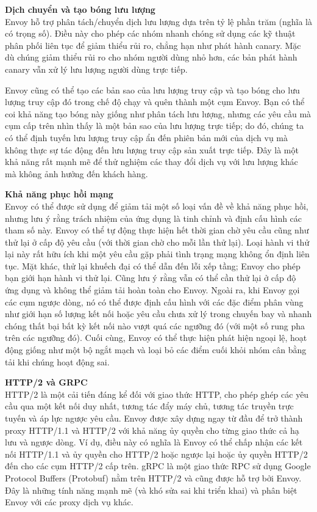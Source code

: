\documentclass[12pt,a4paper]{report}
\begin{document}
		\textbf{Dịch chuyển và tạo bóng lưu lượng}\\
		Envoy hỗ trợ phân tách/chuyển dịch lưu lượng dựa trên tỷ lệ phần trăm (nghĩa là có trọng số). Điều này cho phép các nhóm nhanh chóng sử dụng các kỹ thuật phân phối liên tục để giảm thiểu rủi ro, chẳng hạn như phát hành canary. Mặc dù chúng giảm thiểu rủi ro cho nhóm người dùng nhỏ hơn, các bản phát hành canary vẫn xử lý lưu lượng người dùng trực tiếp.
		
		Envoy cũng có thể tạo các bản sao của lưu lượng truy cập và tạo bóng cho lưu lượng truy cập đó trong chế độ chạy và quên thành một cụm Envoy. Bạn có thể coi khả năng tạo bóng này giống như phân tách lưu lượng, nhưng các yêu cầu mà cụm cấp trên nhìn thấy là một bản sao của lưu lượng trực tiếp; do đó, chúng ta có thể định tuyến lưu lượng truy cập ẩn đến phiên bản mới của dịch vụ mà không thực sự tác động đến lưu lượng truy cập sản xuất trực tiếp. Đây là một khả năng rất mạnh mẽ để thử nghiệm các thay đổi dịch vụ với lưu lượng khác mà không ảnh hưởng đến khách hàng.
		
		\textbf{Khả năng phục hồi mạng}\\
		Envoy có thể được sử dụng để giảm tải một số loại vấn đề về khả năng phục hồi, nhưng lưu ý rằng trách nhiệm của ứng dụng là tinh chỉnh và định cấu hình các tham số này. Envoy có thể tự động thực hiện hết thời gian chờ yêu cầu cũng như thử lại ở cấp độ yêu cầu (với thời gian chờ cho mỗi lần thử lại). Loại hành vi thử lại này rất hữu ích khi một yêu cầu gặp phải tình trạng mạng không ổn định liên tục. Mặt khác, thử lại khuếch đại có thể dẫn đến lỗi xếp tầng; Envoy cho phép bạn giới hạn hành vi thử lại. Cũng lưu ý rằng vẫn có thể cần thử lại ở cấp độ ứng dụng và không thể giảm tải hoàn toàn cho Envoy. Ngoài ra, khi Envoy gọi các cụm ngược dòng, nó có thể được định cấu hình với các đặc điểm phân vùng như giới hạn số lượng kết nối hoặc yêu cầu chưa xử lý trong chuyến bay và nhanh chóng thất bại bất kỳ kết nối nào vượt quá các ngưỡng đó (với một số rung pha trên các ngưỡng đó). Cuối cùng, Envoy có thể thực hiện phát hiện ngoại lệ, hoạt động giống như một bộ ngắt mạch và loại bỏ các điểm cuối khỏi nhóm cân bằng tải khi chúng hoạt động sai.
		
		\textbf{HTTP/2 và GRPC}\\
		HTTP/2 là một cải tiến đáng kể đối với giao thức HTTP, cho phép ghép các yêu cầu qua một kết nối duy nhất, tương tác đẩy máy chủ, tương tác truyền trực tuyến và áp lực ngược yêu cầu. Envoy được xây dựng ngay từ đầu để trở thành proxy HTTP/1.1 và HTTP/2 với khả năng ủy quyền cho từng giao thức cả hạ lưu và ngược dòng. Ví dụ, điều này có nghĩa là Envoy có thể chấp nhận các kết nối HTTP/1.1 và ủy quyền cho HTTP/2 hoặc ngược lại hoặc ủy quyền HTTP/2 đến cho các cụm HTTP/2 cấp trên. gRPC là một giao thức RPC sử dụng Google Protocol Buffers (Protobuf) nằm trên HTTP/2 và cũng được hỗ trợ bởi Envoy. Đây là những tính năng mạnh mẽ (và khó sửa sai khi triển khai) và phân biệt Envoy với các proxy dịch vụ khác.
		
\end{document}
